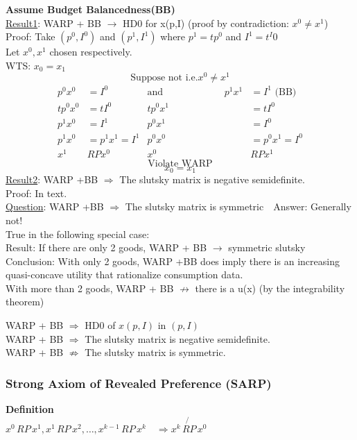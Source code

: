 \documentclass[letterpaper,13pt,single,pdftex]{scrartcl}
\begin{document}
{\textbf{Assume Budget Balancedness(BB)}\\
\underline{Result1}: WARP + BB $\rightarrow$ HD0 for x(p,I)  (proof by contradiction: $x^0 \ne x^1$)\\
Proof: 
Take $(p^0, I^0)$ and $(p^1, I^1)$ where $p^1 = tp^0$ and $I^1 = t^I0$\\
Let $x^0, x^1$ chosen respectively. \\
WTS: $x_0 = x_1$
\[ \text{Suppose not i.e.} x^0 \ne x^1\]
\begin{align*}
    p^0 x^0 &= I^0 &\text{and } \qquad \qquad \qquad p^1x^1 &= I^1 \text{ (BB)}\\
    tp^0x^0 &=tI^0 & tp^0x^1 &=tI^0\\
    p^1x^0 &= I^1 & p^0x^1 &= I^0\\
    p^1x^0 &= p^1x^1 = I^1 & p^0x^0 &= p^0x^1= I^0\\
    x^1 & RP x^0 & x^0 & RP {x^1}
\end{align*}
\[\text{Violate WARP}\]
\[x_0 = x_1\]
\underline{Result2}: WARP +BB $\Rightarrow$ The slutsky matrix is negative semidefinite.\\
Proof: In text.\\

\underline{Question}: WARP +BB $\Rightarrow$ The slutsky matrix is symmetric\ \ Answer: Generally not!}
 \\True in the following special case:\\
 Result: If there are only 2 goods, WARP + BB $\rightarrow$ symmetric slutsky\\
 Conclusion: With only 2 goods, WARP +BB does imply there is an increasing quasi-concave utility that rationalize consumption data.\\
 With more than 2 goods, WARP + BB $\not\rightarrow$ there is a u(x) (by the integrability theorem)
 
 WARP + BB $\Rightarrow$ HD0 of $x(p,I) $ in $ (p,I)$\\
 WARP + BB $\Rightarrow$ The slutsky matrix is negative semidefinite. \\
 WARP + BB $\not\Rightarrow$ The slutsky matrix is symmetric. 

\subsubsection{Strong Axiom of Revealed Preference (SARP)}
\textbf{Definition}\\
 $x^0 \,RP \,x^1, x^1\,RP \,x^2, \dots, x^{k-1}\, RP \,x^k \quad \Rightarrow x^k\, \not{RP}\,x^0$
\end{document}
